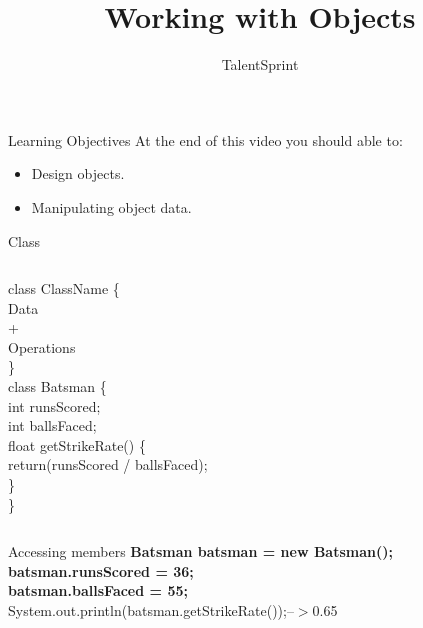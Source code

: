 \documentclass[aspectratio=169,14pt,usenames,dvipsnames]{beamer}
\title[Working with Objects]{Working with Objects}
\newcommand\tab[1][1cm]{\hspace*{#1}}
\begin{document}
{\1
\begin{frame} \vspace{35pt}

\subtitle{TalentSprint}
\maketitle
\end{frame}
}

\begin{frame}{Learning Objectives}
At the end of this video you should able to:
\begin{itemize}
\item Design objects.
\item Manipulating object data.
\end{itemize}
\end{frame}




\begin{frame}{Class}
\begin{columns}
class ClassName \{\\
Data\\
+\\
Operations\\
\}\\

class Batsman \{\\
\tab int runsScored;\\
\tab int ballsFaced;\\
\tab float getStrikeRate() \{\\
\tab \tab return(runsScored / ballsFaced);\\
\tab \}\\
\}\\
\end{columns}
\end{frame}


\begin{frame}{Accessing members}
\textbf{Batsman batsman = new Batsman();}\\
\vspace{1em}
\textbf{batsman.runsScored = 36;}\\
\textbf{batsman.ballsFaced = 55;}\\
\vspace{3em}
System.out.println(batsman.getStrikeRate());--$>$0.65
\end{frame}
\end{document}
